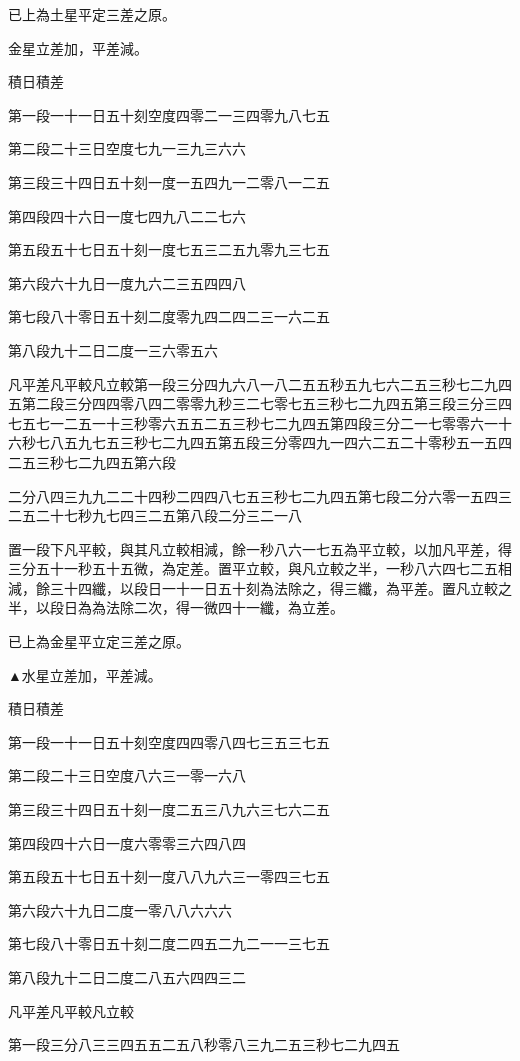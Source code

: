 已上為土星平定三差之原。

金星立差加，平差減。

積日積差

第一段一十一日五十刻空度四零二一三四零九八七五

第二段二十三日空度七九一三九三六六

第三段三十四日五十刻一度一五四九一二零八一二五

第四段四十六日一度七四九八二二七六

第五段五十七日五十刻一度七五三二五九零九三七五

第六段六十九日一度九六二三五四四八

第七段八十零日五十刻二度零九四二四二三一六二五

第八段九十二日二度一三六零五六

凡平差凡平較凡立較第一段三分四九六八一八二五五秒五九七六二五三秒七二九四五第二段三分四四零八四二零零九秒三二七零七五三秒七二九四五第三段三分三四七五七一二五一十三秒零六五五二五三秒七二九四五第四段三分二一七零零六一十六秒七八五九七五三秒七二九四五第五段三分零四九一四六二五二十零秒五一五四二五三秒七二九四五第六段

二分八四三九九二二十四秒二四四八七五三秒七二九四五第七段二分六零一五四三二五二十七秒九七四三二五第八段二分三二一八

置一段下凡平較，與其凡立較相減，餘一秒八六一七五為平立較，以加凡平差，得三分五十一秒五十五微，為定差。置平立較，與凡立較之半，一秒八六四七二五相減，餘三十四纖，以段日一十一日五十刻為法除之，得三纖，為平差。置凡立較之半，以段日為為法除二次，得一微四十一纖，為立差。

已上為金星平立定三差之原。

▲水星立差加，平差減。

積日積差

第一段一十一日五十刻空度四四零八四七三五三七五

第二段二十三日空度八六三一零一六八

第三段三十四日五十刻一度二五三八九六三七六二五

第四段四十六日一度六零零三六四八四

第五段五十七日五十刻一度八八九六三一零四三七五

第六段六十九日二度一零八八六六六

第七段八十零日五十刻二度二四五二九二一一三七五

第八段九十二日二度二八五六四四三二

凡平差凡平較凡立較

第一段三分八三三四五五二五八秒零八三九二五三秒七二九四五

